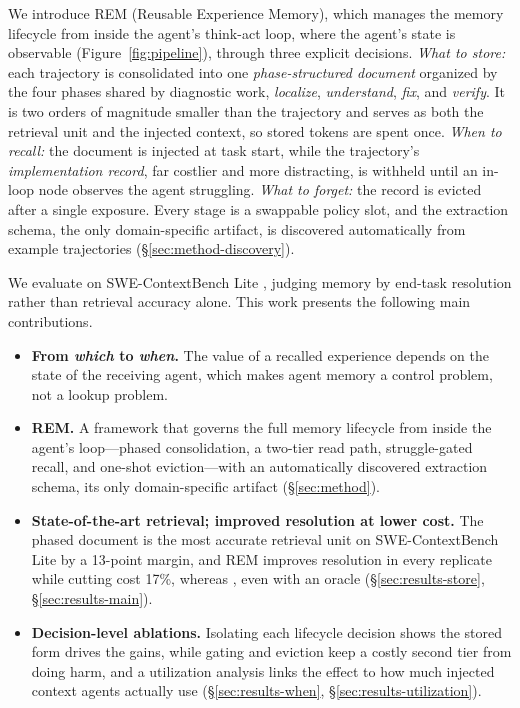 \documentclass{article}
\newcommand{\sysname}{REM}
\begin{document}
We introduce \sysname{} (Reusable Experience Memory), which manages the memory lifecycle from inside the agent's think-act loop, where the agent's state is observable (Figure~\ref{fig:pipeline}), through three explicit decisions. \emph{What to store:} each trajectory is consolidated into one \emph{phase-structured document} organized by the four phases shared by diagnostic work, \emph{localize}, \emph{understand}, \emph{fix}, and \emph{verify}. It is two orders of magnitude smaller than the trajectory and serves as both the retrieval unit and the injected context, so stored tokens are spent once. \emph{When to recall:} the document is injected at task start, while the trajectory's \emph{implementation record}, far costlier and more distracting, is withheld until an in-loop node observes the agent struggling. \emph{What to forget:} the record is evicted after a single exposure. Every stage is a swappable policy slot, and the extraction schema, the only domain-specific artifact, is discovered automatically from example trajectories (\S\ref{sec:method-discovery}).

We evaluate on SWE-ContextBench Lite \citep{zhang2026swecontextbench}, judging memory by end-task resolution rather than retrieval accuracy alone. This work presents the following main contributions.
\begin{itemize}[leftmargin=1.2em, itemsep=2pt, topsep=3pt, parsep=0pt]
\item \textbf{From \emph{which} to \emph{when}.} The value of a recalled experience depends on the state of the receiving agent, which makes agent memory a control problem, not a lookup problem.
\item \textbf{\sysname{}.} A framework that governs the full memory lifecycle from inside the agent's loop---phased consolidation, a two-tier read path, struggle-gated recall, and one-shot eviction---with an automatically discovered extraction schema, its only domain-specific artifact (\S\ref{sec:method}).
\item \textbf{State-of-the-art retrieval; improved resolution at lower cost.} The phased document is the most accurate retrieval unit on SWE-ContextBench Lite by a 13-point margin, and \sysname{} improves resolution in every replicate while cutting cost 17\%, whereas , even with an oracle (\S\ref{sec:results-store}, \S\ref{sec:results-main}).
\item \textbf{Decision-level ablations.} Isolating each lifecycle decision shows the stored form drives the gains, while gating and eviction keep a costly second tier from doing harm, and a utilization analysis links the effect to how much injected context agents actually use (\S\ref{sec:results-when}, \S\ref{sec:results-utilization}).
\end{itemize}
\end{document}
